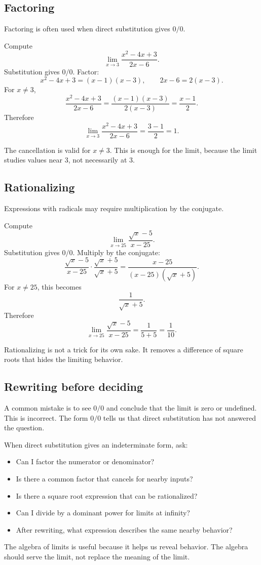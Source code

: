 \subsection*{Factoring}

Factoring is often used when direct substitution gives \(0/0\).

\begin{examplebox}
Compute
\[
\lim_{x\to3}\frac{x^2-4x+3}{2x-6}.
\]
Substitution gives \(0/0\). Factor:
\[
x^2-4x+3=(x-1)(x-3),
\qquad
2x-6=2(x-3).
\]
For \(x\ne3\),
\[
\frac{x^2-4x+3}{2x-6}=\frac{(x-1)(x-3)}{2(x-3)}=\frac{x-1}{2}.
\]
Therefore
\[
\lim_{x\to3}\frac{x^2-4x+3}{2x-6}=\frac{3-1}{2}=1.
\]
\end{examplebox}

The cancellation is valid for \(x\ne3\). This is enough for the limit, because the limit studies values near \(3\), not necessarily at \(3\).

\subsection*{Rationalizing}

Expressions with radicals may require multiplication by the conjugate.

\begin{examplebox}
Compute
\[
\lim_{x\to25}\frac{\sqrt{x}-5}{x-25}.
\]
Substitution gives \(0/0\). Multiply by the conjugate:
\[
\frac{\sqrt{x}-5}{x-25}\cdot\frac{\sqrt{x}+5}{\sqrt{x}+5}
=
\frac{x-25}{(x-25)(\sqrt{x}+5)}.
\]
For \(x\ne25\), this becomes
\[
\frac{1}{\sqrt{x}+5}.
\]
Therefore
\[
\lim_{x\to25}\frac{\sqrt{x}-5}{x-25}=\frac1{5+5}=\frac1{10}.
\]
\end{examplebox}

Rationalizing is not a trick for its own sake. It removes a difference of square roots that hides the limiting behavior.

\subsection*{Rewriting before deciding}

A common mistake is to see \(0/0\) and conclude that the limit is zero or undefined. This is incorrect. The form \(0/0\) tells us that direct substitution has not answered the question.

\begin{summarybox}
When direct substitution gives an indeterminate form, ask:
\begin{itemize}
\item Can I factor the numerator or denominator?
\item Is there a common factor that cancels for nearby inputs?
\item Is there a square root expression that can be rationalized?
\item Can I divide by a dominant power for limits at infinity?
\item After rewriting, what expression describes the same nearby behavior?
\end{itemize}
\end{summarybox}

The algebra of limits is useful because it helps us reveal behavior. The algebra should serve the limit, not replace the meaning of the limit.